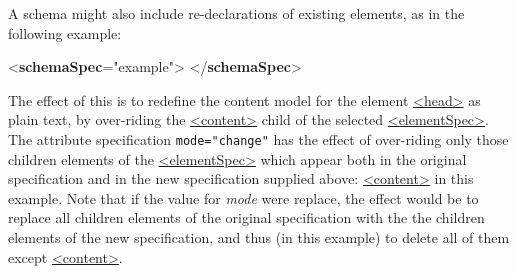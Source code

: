 A schema might also include re-declarations of existing elements, as in the following example: \par\bgroup{}\exampleFont \begin{shaded}\noindent\mbox{}{<\textbf{schemaSpec}\hspace*{1em}{ident}="{example}">}\mbox{}\newline 
{}\mbox{}\newline 
{}\mbox{}\newline 
{}\mbox{}\newline 
\hspace*{1em}\mbox{}\newline 
\hspace*{1em}\hspace*{1em}\mbox{}\newline 
\hspace*{1em}\mbox{}\newline 
{}\mbox{}\newline 
{</\textbf{schemaSpec}>}\end{shaded}\egroup\par \noindent  The effect of this is to redefine the content model for the element \hyperref[TEI.head]{<head>} as plain text, by over-riding the \hyperref[TEI.content]{<content>} child of the selected \hyperref[TEI.elementSpec]{<elementSpec>}. The attribute specification \texttt{mode="change"} has the effect of over-riding only those children elements of the \hyperref[TEI.elementSpec]{<elementSpec>} which appear both in the original specification and in the new specification supplied above: \hyperref[TEI.content]{<content>} in this example. Note that if the value for {\itshape mode} were replace, the effect would be to replace all children elements of the original specification with the the children elements of the new specification, and thus (in this example) to delete all of them except \hyperref[TEI.content]{<content>}.\par
